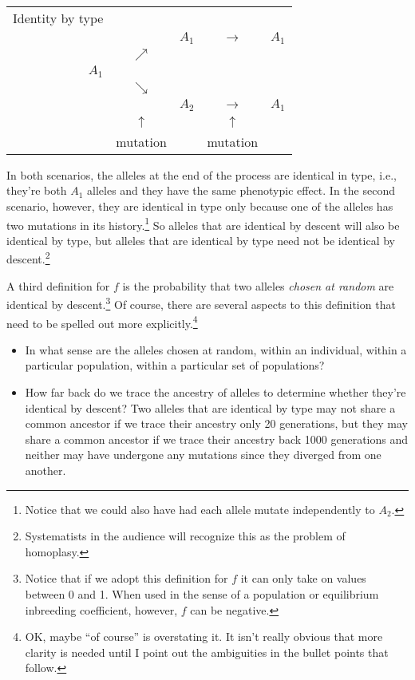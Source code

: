 \begin{center}
\begin{tabular}{rcccc}
Identity by type \\
      &            & $A_1$ & $\rightarrow$ & $A_1$ \\
      & $\nearrow$ &       &               & \\
$A_1$ &            &       &               & \\
      & $\searrow$ &       &               & \\
      &            & $A_2$ & $\rightarrow$ & $A_1$ \\
      & $\uparrow$ &       & $\uparrow$    & \\
      & mutation   &       & mutation      & 
\end{tabular}
\end{center}

In both scenarios, the alleles at the end of the process are identical
in type, i.e., they're both $A_1$ alleles and they have the same
phenotypic effect. In the second scenario, however, they are identical
in type only because one of the alleles has two mutations in its
history.\footnote{Notice that we could also have had each allele
  mutate independently to $A_2$.} So alleles that are identical by
descent will also be identical by type, but alleles that are identical
by type need not be identical by descent.\footnote{Systematists in the
  audience will recognize this as the problem of homoplasy.}

A third definition for $f$ is the probability that two alleles {\it
chosen at random\/} are identical by descent.\footnote{Notice that if
we adopt this definition for $f$ it can only take on values between 0
and 1. When used in the sense of a population or equilibrium
inbreeding coefficient, however, $f$ can be negative.}  Of course,
there are several aspects to this definition that need to be spelled
out more explicitly.\footnote{OK, maybe ``of course'' is overstating
  it. It isn't really obvious that more clarity is needed until I
  point out the ambiguities in the bullet points that follow.}

\begin{itemize}

\item In what sense are the alleles chosen at random, within an
individual, within a particular population, within a particular set of
populations? 

\item How far back do we trace the ancestry of alleles to determine
whether they're identical by descent? Two alleles that are identical
by type may not share a common ancestor if we trace their ancestry
only 20 generations, but they may share a common ancestor if we trace
their ancestry back 1000 generations and neither may have undergone
any mutations since they diverged from one another.

\end{itemize}

